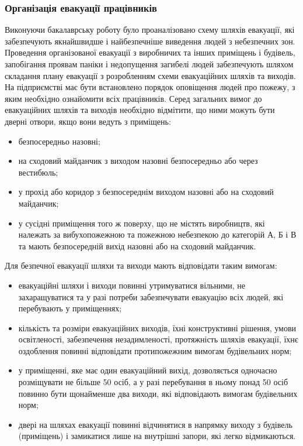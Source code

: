 \documentclass[12pt,a4paper]{article}
\begin{document}
\subsubsection{Організація евакуації працівників}
Виконуючи бакалаврську роботу було проаналізовано схему шляхів евакуації, які забезпечують якнайшвидше і найбезпечніше виведення людей з небезпечних зон.
Проведення організованої евакуації з виробничих та інших приміщень і будівель, запобігання проявам паніки і недопущення загибелі людей забезпечують шляхом складання плану евакуації з розробленням схеми евакуаційних шляхів та виходів. На підприємстві має бути встановлено порядок оповіщення людей про пожежу, з яким необхідно ознайомити всіх працівників. 
Серед загальних вимог до евакуаційних шляхів та виходів необхідно відмітити, що ними можуть бути дверні отвори, якщо вони ведуть з приміщень: 
\begin{itemize}
\item	безпосередньо назовні; 
\item	на сходовий майданчик з виходом назовні безпосередньо або через вестибюль; 
\item	у прохід або коридор з безпосереднім виходом назовні або на сходовий майданчик; 
\item	у сусідні приміщення того ж поверху, що не містять виробництв, які належать за вибухопожежною та пожежною небезпекою до категорій А, Б і В та мають безпосередній вихід назовні або на сходовий майданчик. 
\end{itemize}
Для безпечної евакуації шляхи та виходи мають відповідати таким вимогам: 
\begin{itemize}
\item	евакуаційні шляхи і виходи повинні утримуватися вільними, не захаращуватися та у разі потреби забезпечувати евакуацію всіх людей, які перебувають у приміщеннях;
\item	кількість та розміри евакуаційних виходів, їхні конструктивні рішення, умови освітленості, забезпечення незадимленості, протяжність шляхів евакуації, їхнє оздоблення повинні відповідати протипожежним вимогам будівельних норм;
\item	у приміщенні, яке має один евакуаційний вихід, дозволяється одночасно розміщувати не більше 50 осіб, а у разі перебування в ньому понад 50 осіб повинно бути щонайменше два виходи, які відповідають вимогам будівельних норм;
\item	двері на шляхах евакуації повинні відчинятися в напрямку виходу з будівель (приміщень) і замикатися лише на внутрішні запори, які легко відмикаються.
\end{itemize}
\end{document}
